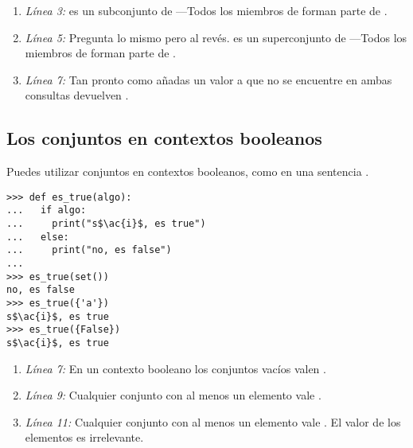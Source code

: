 \begin{enumerate}

\item \emph{Línea 3:}  es un subconjunto de  ---Todos los miembros de  forman parte de .

\item \emph{Línea 5:} Pregunta lo mismo pero al revés.  es un superconjunto de  ---Todos los miembros de  forman parte de .

\item \emph{Línea 7:} Tan pronto como añadas un valor a  que no se encuentre en  ambas consultas devuelven .

\end{enumerate}

\subsection{Los conjuntos en contextos booleanos}

Puedes utilizar conjuntos en contextos booleanos, como en una sentencia .

\noindent\begin{minipage}{\textwidth}
\begin{lstlisting}[mathescape=True]
>>> def es_true(algo):
...   if algo:
...     print("s$\ac{i}$, es true")
...   else:
...     print("no, es false")
...
>>> es_true(set())
no, es false
>>> es_true({'a'})
s$\ac{i}$, es true
>>> es_true({False})
s$\ac{i}$, es true
\end{lstlisting}
\end{minipage}

\begin{enumerate}

\item \emph{Línea 7:} En un contexto booleano los conjuntos vacíos valen .

\item \emph{Línea 9:} Cualquier conjunto con al menos un elemento vale .

\item \emph{Línea 11:} Cualquier conjunto con al menos un elemento vale . El valor de los elementos es irrelevante.

\end{enumerate}

